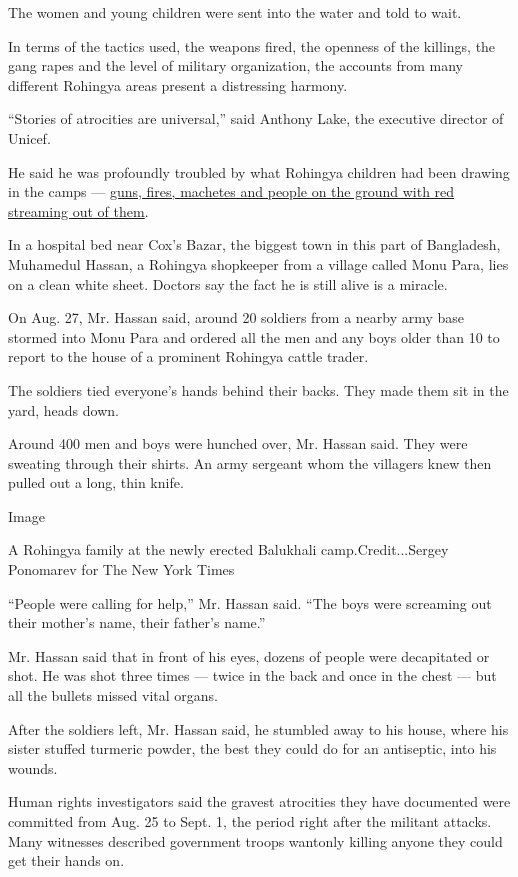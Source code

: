 The women and young children were sent into the water and told to wait.

In terms of the tactics used, the weapons fired, the openness of the
killings, the gang rapes and the level of military organization, the
accounts from many different Rohingya areas present a distressing
harmony.

``Stories of atrocities are universal,'' said Anthony Lake, the
executive director of Unicef.

He said he was profoundly troubled by what Rohingya children had been
drawing in the camps ---
\href{https://weshare.unicef.org/C.aspx?VP3=SearchResult\&LBID=2AMZKTG1WYH\&IT=Thumb_FixedHeight_M_Details_ToolTip}{guns,
fires, machetes and people on the ground with red streaming out of
them}.

In a hospital bed near Cox's Bazar, the biggest town in this part of
Bangladesh, Muhamedul Hassan, a Rohingya shopkeeper from a village
called Monu Para, lies on a clean white sheet. Doctors say the fact he
is still alive is a miracle.

On Aug. 27, Mr. Hassan said, around 20 soldiers from a nearby army base
stormed into Monu Para and ordered all the men and any boys older than
10 to report to the house of a prominent Rohingya cattle trader.

The soldiers tied everyone's hands behind their backs. They made them
sit in the yard, heads down.

Around 400 men and boys were hunched over, Mr. Hassan said. They were
sweating through their shirts. An army sergeant whom the villagers knew
then pulled out a long, thin knife.

Image

A Rohingya family at the newly erected Balukhali camp.Credit...Sergey
Ponomarev for The New York Times

``People were calling for help,'' Mr. Hassan said. ``The boys were
screaming out their mother's name, their father's name.''

Mr. Hassan said that in front of his eyes, dozens of people were
decapitated or shot. He was shot three times --- twice in the back and
once in the chest --- but all the bullets missed vital organs.

After the soldiers left, Mr. Hassan said, he stumbled away to his house,
where his sister stuffed turmeric powder, the best they could do for an
antiseptic, into his wounds.

Human rights investigators said the gravest atrocities they have
documented were committed from Aug. 25 to Sept. 1, the period right
after the militant attacks. Many witnesses described government troops
wantonly killing anyone they could get their hands on.

